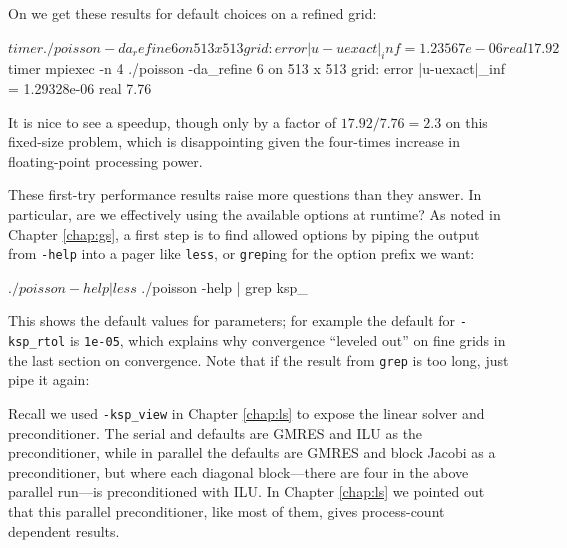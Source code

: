 On \WORKSTATION we get these results for default choices on a refined grid:
\begin{cline}
$ timer ./poisson -da_refine 6 
on 513 x 513 grid:  error |u-uexact|_inf = 1.23567e-06
real 17.92
$ timer mpiexec -n 4 ./poisson -da_refine 6 
on 513 x 513 grid:  error |u-uexact|_inf = 1.29328e-06
real 7.76
\end{cline}
It is nice to see a speedup, though only by a factor of $17.92/7.76 = 2.3$ on this fixed-size problem, which is disappointing given the four-times increase in floating-point processing power.

These first-try performance results raise more questions than they answer.  In particular, are we effectively using the available \PETSc options at runtime?  As noted in Chapter \ref{chap:gs}, a first step is to find allowed options by piping the output from \texttt{-help} into a pager like \texttt{less}, or \texttt{grep}ing for the option prefix we want:
\begin{cline}
$ ./poisson -help | less
$ ./poisson -help | grep ksp_
\end{cline}
This shows the default values for parameters; for example the default for \texttt{-ksp\_rtol} is \texttt{1e-05}, which explains why convergence ``leveled out'' on fine grids in the last section on convergence.  Note that if the result from \texttt{grep} is too long, just pipe it again:

Recall we used \texttt{-ksp\_view} in Chapter \ref{chap:ls} to expose the linear solver and preconditioner.  The serial \pKSP and \pPC defaults are GMRES and ILU as the preconditioner, while in parallel the defaults are GMRES and block Jacobi as a preconditioner, but where each diagonal block---there are four in the above parallel run---is preconditioned with ILU.  In Chapter \ref{chap:ls} we pointed out that this parallel preconditioner, like most of them, gives process-count dependent results.


